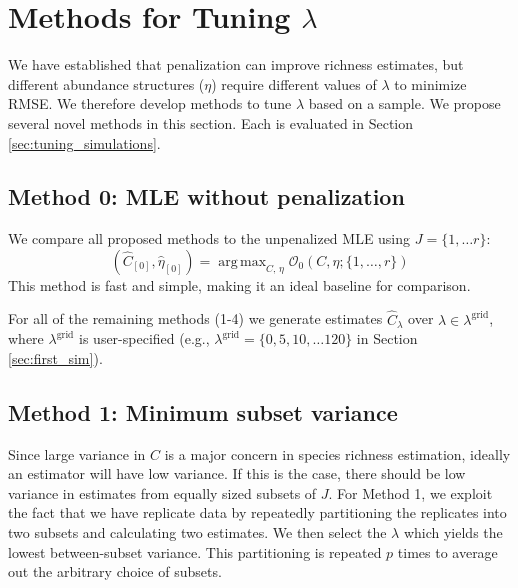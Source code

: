 \documentclass[12pt]{article}
\DeclareMathOperator*{\argmax}{arg\,max}
\newcommand{\lambdagrid}{\lambda^{\text{grid}}}
\theoremstyle{break}
\theoremstyle{break}
\begin{document}
%
%
%
\section{Methods for Tuning $\lambda$}
\label{sec:tuning_proposals}

We have established that penalization can improve richness estimates, but different abundance structures ($\eta$) require different values of $\lambda$ to minimize RMSE. We therefore develop methods to tune $\lambda$ based on a sample.  We propose several novel methods in this section.  Each is evaluated in Section \ref{sec:tuning_simulations}.

\setcounter{subsection}{-1}
\subsection{Method 0: MLE without penalization}

We compare all proposed methods to the unpenalized MLE using $J = \{1, \dots r \}$:
\begin{equation}
\left(\widehat{C}_{[0]},  \widehat{\eta}_{[0]} \right) = \argmax_{C, \, \eta}  \mathcal{O}_{0}\left(C, \eta ; \{1, \dots , r\} \right) \label{eq:c_hat_0}
\end{equation}
This method is fast and simple, making it an ideal baseline for comparison.

For all of the remaining methods (1-4) we generate estimates $\widehat{C}_\lambda$ over $\lambda \in \lambda^{\text{grid}}$, where $\lambdagrid$ is user-specified (e.g., $\lambdagrid = \{0, 5, 10, \dots 120\}$ in Section \ref{sec:first_sim}).  %

%
%
\subsection{Method 1: Minimum subset variance}

Since large variance in $C$ is a major concern in species richness estimation, ideally an estimator will have low variance. If this is the case, there should be low variance in estimates from equally sized subsets of $J$.
For Method 1, we exploit the fact that we have replicate data by repeatedly partitioning the replicates into two subsets and calculating two estimates.  We then select the $\lambda$ which yields the lowest between-subset variance.  This partitioning is repeated $p$ times to average out the arbitrary choice of subsets.
\end{document}
